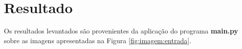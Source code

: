 \documentclass{article}
\begin{document}
%
%
%
%
%
%
%
%
%
%
%
%

%
\section{Resultado}
Os resultados levantados são provenientes da aplicação do programa \textbf{main.py} sobre as imagens apresentadas na Figura \ref{fig:imagem:entrada}. 
\end{document}
